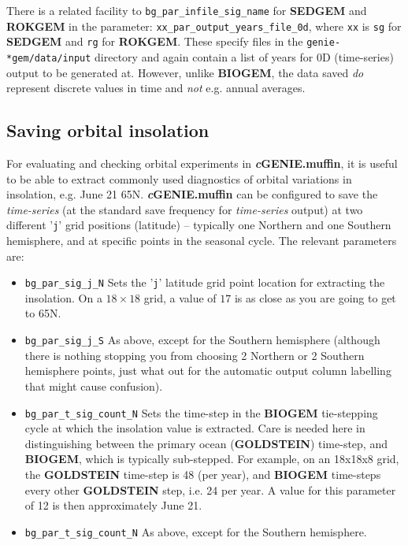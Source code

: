 \documentclass[11pt,fleqn]{book} %
\begin{document}
There is a related facility to \texttt{bg\_par\_infile\_sig\_name} for \textbf{SEDGEM} and \textbf{ROKGEM} in the parameter: \texttt{xx\_par\_output\_years\_file\_0d}, where \texttt{xx} is \texttt{sg} for \textbf{SEDGEM} and \texttt{rg} for \textbf{ROKGEM}. These specify files in the \texttt{genie-*gem/data/input} directory and again contain a list of years for 0D (time-series) output to be generated at. However, unlike \textbf{BIOGEM}, the data saved \textit{do} represent discrete values in time and \textit{not} e.g. annual averages.


\subsection{Saving orbital insolation}

For evaluating and checking orbital experiments in \textbf{\textit{c}GENIE.muffin}, it is useful to be able to extract commonly used diagnostics of orbital variations in insolation, e.g. June 21 65N. \textbf{\textit{c}GENIE.muffin} can be configured to save the \textit{time-series} (at the standard save frequency for \textit{time-series} output) at two different '\texttt{j}' grid positions (latitude) -- typically one Northern and one Southern hemisphere, and at specific points in the seasonal cycle. The relevant parameters are:

\begin{itemize}
\item \texttt{bg\_par\_sig\_j\_N}
Sets the '\texttt{j}'  latitude grid point location for extracting the insolation. On a \(18\times18\) grid, a value of \(17\) is as close as you are going to get to 65N.
\item \texttt{bg\_par\_sig\_j\_S}
As above, except for the Southern hemisphere (although there is nothing stopping you from choosing 2 Northern or 2 Southern hemisphere points, just what out for the automatic output column labelling that might cause confusion).
\item \texttt{bg\_par\_t\_sig\_count\_N}
Sets the time-step in the \textbf{BIOGEM} tie-stepping cycle at which the insolation value is extracted. Care is needed here in distinguishing between the primary ocean (\textbf{GOLDSTEIN}) time-step, and \textbf{BIOGEM}, which is typically sub-stepped. For  example, on an 18x18x8 grid, the \textbf{GOLDSTEIN} time-step is 48 (per year), and \textbf{BIOGEM} time-steps every other \textbf{GOLDSTEIN} step, i.e. 24 per year. A value for this parameter of 12 is then approximately June 21.
\item \texttt{bg\_par\_t\_sig\_count\_N}
As above, except for the Southern hemisphere.
\end{itemize}
\end{document}
